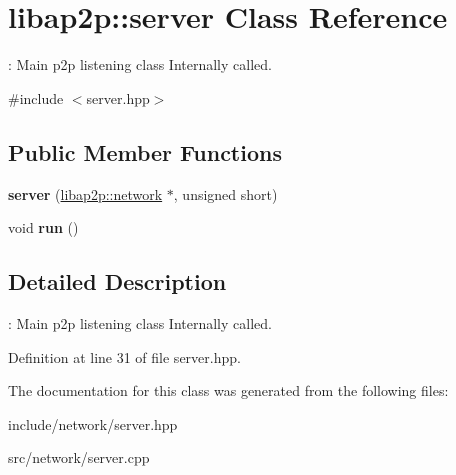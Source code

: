 \hypertarget{classlibap2p_1_1server}{\section{libap2p\-:\-:server Class Reference}
\label{classlibap2p_1_1server}
}


\-: Main p2p listening class Internally called.  




{\ttfamily \#include $<$server.\-hpp$>$}

\subsection*{Public Member Functions}
\begin{DoxyCompactItemize}
\item 
\hypertarget{classlibap2p_1_1server_a827f2a4dcc2f53e8113bb933afa477c3}{{\bfseries server} (\hyperlink{classlibap2p_1_1network}{libap2p\-::network} $\ast$, unsigned short)}\label{classlibap2p_1_1server_a827f2a4dcc2f53e8113bb933afa477c3}

\item 
\hypertarget{classlibap2p_1_1server_aa096494c1d08efd749ac6244dc271596}{void {\bfseries run} ()}\label{classlibap2p_1_1server_aa096494c1d08efd749ac6244dc271596}

\end{DoxyCompactItemize}


\subsection{Detailed Description}
\-: Main p2p listening class Internally called. 

Definition at line 31 of file server.\-hpp.



The documentation for this class was generated from the following files\-:\begin{DoxyCompactItemize}
\item 
include/network/server.\-hpp\item 
src/network/server.\-cpp\end{DoxyCompactItemize}
